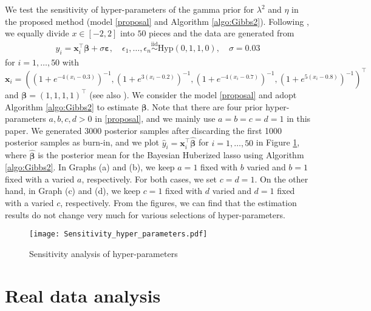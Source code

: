 \documentclass[11pt]{article}
\theoremstyle{plain}
\theoremstyle{definition}
\begin{document}
We test the sensitivity of hyper-parameters of the gamma prior for $\lambda^2$ and $\eta$ in the proposed method (model \eqref{proposal} and Algorithm \ref{algo:Gibbs2}). Following \cite{CS21}, we equally divide $x \in [-2,2]$ into $50$ pieces and the data are generated from
\begin{align*}
y_i=\bm{x}_i^{\top} \bm{\beta}+\sigma \bm{\varepsilon}, \quad \epsilon_1,\dots,\epsilon_n \overset{\mathrm{iid}}{\sim} \mathrm{Hyp}(0 , 1 , 1 , 0),\quad \sigma=0.03
\end{align*}
for $i=1,\dots, 50$ with $\bm{x}_i=((1+e^{-4(x_i-0.3)})^{-1}, (1+e^{3(x_i-0.2)})^{-1}, (1+e^{-4(x_i-0.7)})^{-1}, (1+e^{5(x_i-0.8)})^{-1})^{\top}$ and $\bm{\beta}=(1,1,1,1)^{\top}$ (see also \cite{JL07}). We consider the model \eqref{proposal} and adopt Algorithm \ref{algo:Gibbs2} to estimate $\bm{\beta}$. Note that there are four prior hyper-parameters $a,b,c,d>0$ in \eqref{proposal}, and we mainly use $a=b=c=d=1$ in this paper. We generated 3000 posterior samples after discarding the first 1000 posterior samples as burn-in, and we plot $\hat{y}_i =\bm{x}_i^{\top} \hat{\bm{\beta}}$ for $i=1,\dots,50$ in Figure \ref{fig:sensitivity}, where $\hat{\bm{\beta}}$ is the posterior mean for the Bayesian Huberized lasso using Algorithm \ref{algo:Gibbs2}. In Graphs (a) and (b), we keep $a = 1$ fixed with $b$ varied and $b = 1$ fixed with a varied $a$, respectively. For both cases, we set $c=d=1$. On the other hand, in Graph (c) and (d), we keep $c = 1$ fixed with $d$ varied and $d = 1$ fixed with a varied $c$, respectively. From the figures, we can find that the estimation results do not change very much for various selections of hyper-parameters. 

\begin{figure}[htbp]
\centering
\texttt{[image: Sensitivity\_hyper\_parameters.pdf]}
\caption{Sensitivity analysis of hyper-parameters}
\label{fig:sensitivity}
\end{figure}


\section{Real data analysis}
\label{sec:5}
\end{document}
